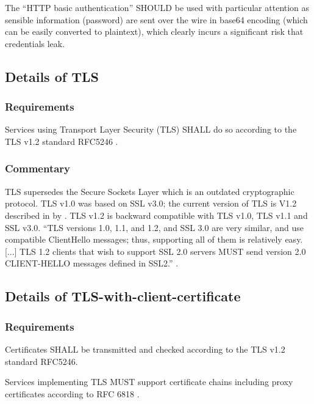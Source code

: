 \documentclass[11pt,a4paper]{ivoa}
\begin{document}
The ``HTTP basic authentication'' SHOULD be used with particular
attention as sensible
information (password) are sent over the wire in base64 encoding (which
can be easily converted to plaintext), which clearly incurs a
significant risk that credentials leak.

\subsection{Details of TLS}
\subsubsection{Requirements}
Services using Transport Layer Security (TLS) SHALL do so according to
the TLS v1.2 standard RFC5246 \citep{std:RFC5246}.

\subsubsection{Commentary}
TLS supersedes the Secure Sockets Layer which is an outdated
cryptographic protocol.
TLS v1.0 was based on SSL v3.0; the current version of TLS is V1.2
described in by \citet{std:RFC5246}.
TLS v1.2 is backward compatible with TLS v1.0, TLS v1.1 and SSL v3.0.
``TLS versions 1.0, 1.1, and 1.2, and SSL 3.0 are very similar, and use
compatible ClientHello messages;
thus, supporting all of them is relatively easy.[...] TLS 1.2 clients
that wish to support SSL 2.0 servers MUST
send  version 2.0 CLIENT-HELLO messages defined in SSL2.''
\citep{std:RFC5246}.

\subsection{Details of TLS-with-client-certificate}
\subsubsection{Requirements}
Certificates SHALL be transmitted and checked according to the TLS v1.2
standard RFC5246.

Services implementing TLS MUST support certificate chains including
proxy certificates according to RFC 6818  \citep{std:RFC6818}.
\end{document}
